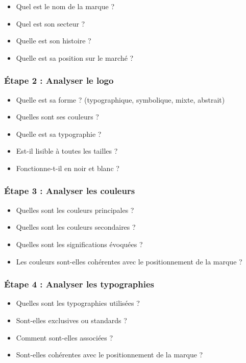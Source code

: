 \begin{itemize}
    \item Quel est le nom de la marque ?
    \item Quel est son secteur ?
    \item Quelle est son histoire ?
    \item Quelle est sa position sur le marché ?
\end{itemize}

\subsubsection{Étape 2 : Analyser le logo}

\begin{itemize}
    \item Quelle est sa forme ? (typographique, symbolique, mixte, abstrait)
    \item Quelles sont ses couleurs ?
    \item Quelle est sa typographie ?
    \item Est-il lisible à toutes les tailles ?
    \item Fonctionne-t-il en noir et blanc ?
\end{itemize}

\subsubsection{Étape 3 : Analyser les couleurs}

\begin{itemize}
    \item Quelles sont les couleurs principales ?
    \item Quelles sont les couleurs secondaires ?
    \item Quelles sont les significations évoquées ?
    \item Les couleurs sont-elles cohérentes avec le positionnement de la marque ?
\end{itemize}

\subsubsection{Étape 4 : Analyser les typographies}

\begin{itemize}
    \item Quelles sont les typographies utilisées ?
    \item Sont-elles exclusives ou standards ?
    \item Comment sont-elles associées ?
    \item Sont-elles cohérentes avec le positionnement de la marque ?
\end{itemize}

